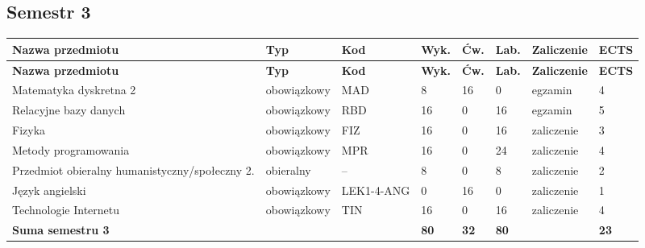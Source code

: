 \documentclass[12pt,a4paper]{article}
\newcommand{\thdrule}{\noalign{\global\setlength{\extrarowheight}{0pt}}}
\newcommand{\thdend}{\noalign{\global\setlength{\extrarowheight}{4pt}}}
\begin{document}
\subsection*{Semestr 3}

{\scriptsize
\begin{longtable}{>{\RaggedRight}m{5.0cm}m{1.9cm}m{0.75cm}m{0.85cm}m{0.85cm}m{0.85cm}m{1.45cm}m{0.9cm}}
\thdrule\toprule
\rowcolor{pjatkRed}
{\color{white}\footnotesize\textbf{\vphantom{Ag}Nazwa przedmiotu}} & {\color{white}\footnotesize\textbf{\vphantom{Ag}Typ}} & {\color{white}\footnotesize\textbf{\vphantom{Ag}Kod}} & {\color{white}\footnotesize\textbf{\vphantom{Ag}Wyk.}} & {\color{white}\footnotesize\textbf{\vphantom{Ag}Ćw.}} & {\color{white}\footnotesize\textbf{\vphantom{Ag}Lab.}} & {\color{white}\footnotesize\textbf{\vphantom{Ag}Zaliczenie}} & {\color{white}\footnotesize\textbf{\vphantom{Ag}ECTS}} \\
\midrule\thdend
\endfirsthead
\thdrule\toprule
\rowcolor{pjatkRed}
{\color{white}\footnotesize\textbf{\vphantom{Ag}Nazwa przedmiotu}} & {\color{white}\footnotesize\textbf{\vphantom{Ag}Typ}} & {\color{white}\footnotesize\textbf{\vphantom{Ag}Kod}} & {\color{white}\footnotesize\textbf{\vphantom{Ag}Wyk.}} & {\color{white}\footnotesize\textbf{\vphantom{Ag}Ćw.}} & {\color{white}\footnotesize\textbf{\vphantom{Ag}Lab.}} & {\color{white}\footnotesize\textbf{\vphantom{Ag}Zaliczenie}} & {\color{white}\footnotesize\textbf{\vphantom{Ag}ECTS}} \\
\midrule\thdend
\endhead
\rowcolor{tableRowLight} Matematyka dyskretna 2 & {\scriptsize obowiązkowy} & MAD & 8 & 16 & 0 & {\scriptsize egzamin} & 4 \\
\rowcolor{tableRowAlt} Relacyjne bazy danych & {\scriptsize obowiązkowy} & RBD & 16 & 0 & 16 & {\scriptsize egzamin} & 5 \\
\rowcolor{tableRowLight} Fizyka & {\scriptsize obowiązkowy} & FIZ & 16 & 0 & 16 & {\scriptsize zaliczenie} & 3 \\
\rowcolor{tableRowAlt} Metody programowania & {\scriptsize obowiązkowy} & MPR & 16 & 0 & 24 & {\scriptsize zaliczenie} & 4 \\
\rowcolor{tableElective} Przedmiot obieralny humanistyczny/społeczny 2. & {\scriptsize obieralny} & -- & 8 & 0 & 8 & {\scriptsize zaliczenie} & 2 \\
\rowcolor{tableRowAlt} Język angielski & {\scriptsize obowiązkowy} & LEK1-4-ANG & 0 & 16 & 0 & {\scriptsize zaliczenie} & 1 \\
\rowcolor{tableRowLight} Technologie Internetu & {\scriptsize obowiązkowy} & TIN & 16 & 0 & 16 & {\scriptsize zaliczenie} & 4 \\
\midrule[\heavyrulewidth]
\rowcolor{tableSummary} \textbf{Suma semestru 3} & & & \textbf{80} & \textbf{32} & \textbf{80} & & \textbf{23} \\
\bottomrule
\end{longtable}}
\end{document}
